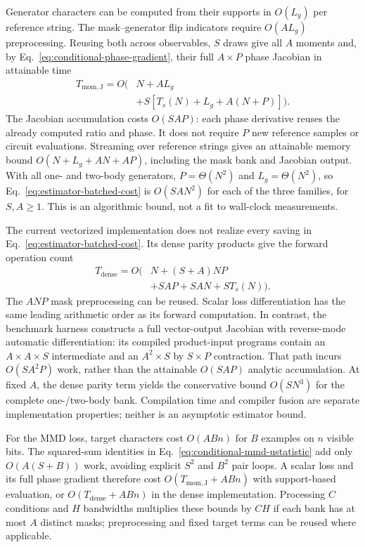 Generator characters can be computed from their supports in $O(L_g)$ per reference string. The mask--generator flip indicators require $O(AL_g)$ preprocessing. Reusing both across observables, $S$ draws give all $A$ moments and, by Eq.~\eqref{eq:conditional-phase-gradient}, their full $A\times P$ phase Jacobian in attainable time
\begin{equation}
\begin{aligned}
    T_{\mathrm{mom,J}}=O\bigl(&N+AL_g\\
      &+S[T_s(N)+L_g+A(N+P)]\bigr).
\end{aligned}
\label{eq:estimator-batched-cost}
\end{equation}
The Jacobian accumulation costs $O(SAP)$: each phase derivative reuses the already computed ratio and phase. It does not require $P$ new reference samples or circuit evaluations. Streaming over reference strings gives an attainable memory bound $O(N+L_g+AN+AP)$, including the mask bank and Jacobian output. With all one- and two-body generators, $P=\Theta(N^2)$ and $L_g=\Theta(N^2)$, so Eq.~\eqref{eq:estimator-batched-cost} is $O(SAN^2)$ for each of the three families, for $S,A\geq1$. This is an algorithmic bound, not a fit to wall-clock measurements.

The current vectorized implementation does not realize every saving in Eq.~\eqref{eq:estimator-batched-cost}. Its dense parity products give the forward operation count
\begin{equation}
\begin{aligned}
    T_{\mathrm{dense}}=O\bigl(&N+(S+A)NP\\
      &+SAP+SAN+ST_s(N)\bigr).
\end{aligned}
\label{eq:estimator-dense-cost}
\end{equation}
The $ANP$ mask preprocessing can be reused. Scalar loss differentiation has the same leading arithmetic order as its forward computation. In contrast, the benchmark harness constructs a full vector-output Jacobian with reverse-mode automatic differentiation: its compiled product-input programs contain an $A\times A\times S$ intermediate and an $A^2\times S$ by $S\times P$ contraction. That path incurs $O(SA^2P)$ work, rather than the attainable $O(SAP)$ analytic accumulation. At fixed $A$, the dense parity term yields the conservative bound $O(SN^3)$ for the complete one-/two-body bank. Compilation time and compiler fusion are separate implementation properties; neither is an asymptotic estimator bound.

For the MMD loss, target characters cost $O(ABn)$ for $B$ examples on $n$ visible bits. The squared-sum identities in Eq.~\eqref{eq:conditional-mmd-ustatistic} add only $O(A(S+B))$ work, avoiding explicit $S^2$ and $B^2$ pair loops. A scalar loss and its full phase gradient therefore cost $O(T_{\mathrm{mom,J}}+ABn)$ with support-based evaluation, or $O(T_{\mathrm{dense}}+ABn)$ in the dense implementation. Processing $C$ conditions and $H$ bandwidths multiplies these bounds by $CH$ if each bank has at most $A$ distinct masks; preprocessing and fixed target terms can be reused where applicable.

